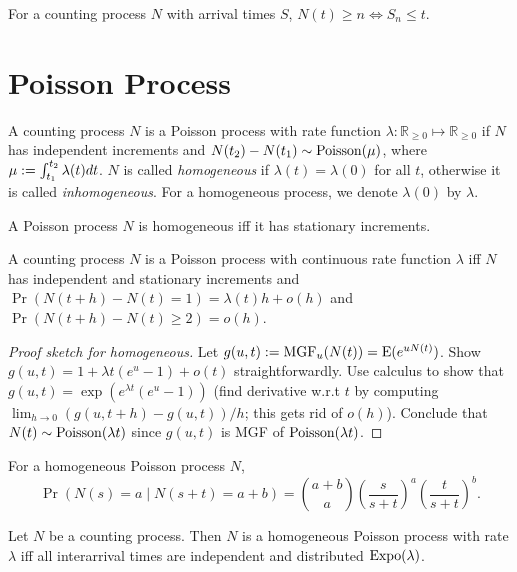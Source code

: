 \documentclass[a4paper, 12pt, fleqn]{article}
\DeclareMathOperator{\MGF}{MGF}
\DeclareMathOperator{\Poisson}{\opname{Poisson}}
\DeclareMathOperator{\Expo}{\opname{Expo}}
\begin{document}
\begin{lemma}
For a counting process $N$ with arrival times $S$, $N(t) \ge n \iff S_n \le t$.
\end{lemma}

\section{Poisson Process}

\begin{definition}
A counting process $N$ is a Poisson process with rate function
$\lambda: \mathbb{R}_{\ge 0} \mapsto \mathbb{R}_{\ge 0}$ if
$N$ has independent increments and $N(t_2)-N(t_1) \sim \Poisson(\mu)$,
where $\mu := \int_{t_1}^{t_2} \lambda(t) dt$.
$N$ is called \emph{homogeneous} if $\lambda(t) = \lambda(0)$ for all $t$,
otherwise it is called \emph{inhomogeneous}.
For a homogeneous process, we denote $\lambda(0)$ by $\lambda$.
\end{definition}

\begin{lemma}
A Poisson process $N$ is homogeneous iff it has stationary increments.
\end{lemma}

\begin{theorem}
A counting process $N$ is a Poisson process with continuous rate function $\lambda$ iff
$N$ has independent and stationary increments and
$\Pr(N(t+h)-N(t) = 1) = \lambda(t) h + o(h)$ and $\Pr(N(t+h)-N(t) \ge 2) = o(h)$.
\end{theorem}
\begin{proof}[Proof sketch for homogeneous]
Let $g(u,t) \defeq \MGF_u(N(t)) = \E(e^{uN(t)})$.
Show $g(u,t) = 1 + \lambda t(e^u-1) + o(t)$ straightforwardly.
Use calculus to show that $g(u,t) = \exp(e^{\lambda t}(e^u-1))$
(find derivative w.r.t $t$ by computing $\lim_{h \to 0} (g(u,t+h)-g(u,t))/h$; this gets rid of $o(h)$).
Conclude that $N(t) \sim \Poisson(\lambda t)$ since $g(u,t)$ is MGF of $\Poisson(\lambda t)$.
\end{proof}

\begin{lemma}
For a homogeneous Poisson process $N$,
\[ \Pr(N(s)=a \mid N(s+t)=a+b) = \binom{a+b}{a}\left(\frac{s}{s+t}\right)^a\left(\frac{t}{s+t}\right)^b. \]
\end{lemma}

\begin{theorem}
Let $N$ be a counting process. Then $N$ is a homogeneous Poisson process with rate $\lambda$
iff all interarrival times are independent and distributed $\Expo(\lambda)$.
\end{theorem}
\end{document}
